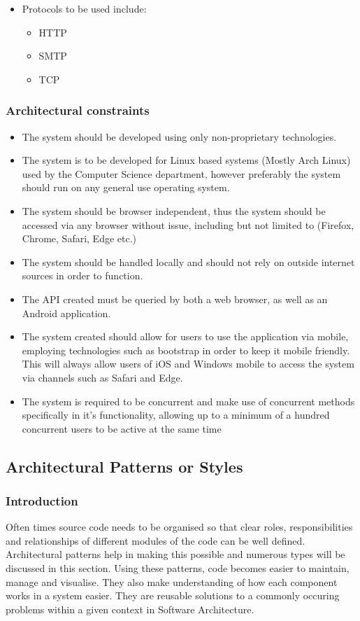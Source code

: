 \documentclass{article}
\begin{document}
		\begin{itemize}
			\item Protocols to be used include:
			\begin{itemize}
				\item HTTP
				\item SMTP
				\item TCP
			\end{itemize}
		\end{itemize}
		
		\subsubsection{Architectural constraints}\label{subsubsec:constraints}
		\begin{itemize}
			\item The system should be developed using only non-proprietary technologies.
			\item The system is to be developed for Linux based systems (Mostly Arch Linux) used by the Computer Science department, however preferably the system should run on any general use operating system.
			\item The system should be browser independent, thus the system should be accessed via any browser without issue, including but not limited to (Firefox, Chrome, Safari, Edge etc.)
			\item The system should be handled locally and should not rely on outside internet sources in order to function.
			\item The API created must be queried by both a web browser, as well as an Android application.
			\item The system created should allow for users to use the application via mobile, employing technologies such as bootstrap in order to keep it mobile friendly. This will always allow users of iOS and Windows mobile to access the system via channels such as Safari and Edge.
			\item The system is required to be concurrent and make use of concurrent methods specifically in it's functionality, allowing up to a minimum of a hundred concurrent users to be active at the same time
		\end{itemize}
		
		\subsection{Architectural Patterns or Styles}
			\subsubsection{Introduction}
Often times source code needs to be organised so that clear roles, responsibilities and relationships of different modules of the code can be well defined. Architectural patterns help in making this possible and numerous types will be discussed in this section. Using these patterns, code becomes easier to maintain, manage and visualise. They also make understanding of how each component works in a system easier. They are reusable solutions to a commonly occuring problems within a given context in Software Architecture.
\end{document}

